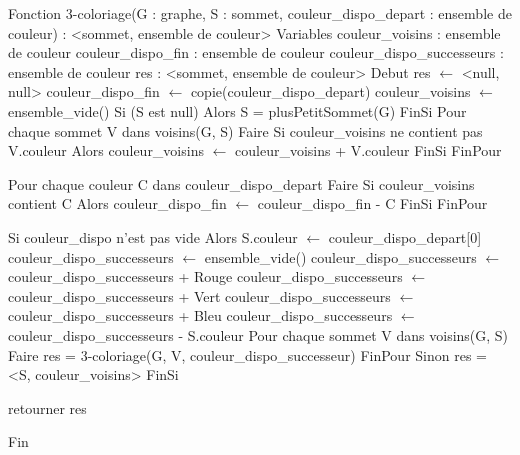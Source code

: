 \begin{algorithm}[caption={3-coloriage}] \label{alg:alg1}
    Fonction 3-coloriage(G : graphe, S : sommet,
        couleur_dispo_depart : ensemble de couleur) : <sommet, ensemble de couleur>
    Variables
        couleur_voisins : ensemble de couleur
        couleur_dispo_fin : ensemble de couleur
        couleur_dispo_successeurs : ensemble de couleur
        res : <sommet, ensemble de couleur>
    Debut
        res $\gets$ <null, null>
        couleur_dispo_fin $\gets$ copie(couleur_dispo_depart)
        couleur_voisins $\gets$ ensemble_vide()
        Si (S est null) Alors
            S = plusPetitSommet(G)
        FinSi
        Pour chaque sommet V dans voisins(G, S) Faire
            Si couleur_voisins ne contient pas V.couleur Alors
                couleur_voisins $\gets$ couleur_voisins + V.couleur
            FinSi
        FinPour

        Pour chaque couleur C dans couleur_dispo_depart Faire
            Si couleur_voisins contient C Alors
                couleur_dispo_fin $\gets$ couleur_dispo_fin - C
            FinSi
        FinPour

        Si couleur_dispo n'est pas vide Alors
            S.couleur $\gets$ couleur_dispo_depart[0]
            couleur_dispo_successeurs $\gets$ ensemble_vide()
            couleur_dispo_successeurs $\gets$ couleur_dispo_successeurs + Rouge
            couleur_dispo_successeurs $\gets$ couleur_dispo_successeurs + Vert
            couleur_dispo_successeurs $\gets$ couleur_dispo_successeurs + Bleu
            couleur_dispo_successeurs $\gets$ couleur_dispo_successeurs - S.couleur
            Pour chaque sommet V dans voisins(G, S) Faire
                res = 3-coloriage(G, V, couleur_dispo_successeur)
            FinPour
        Sinon
            res = <S, couleur_voisins>
        FinSi

        retourner res

    Fin
\end{algorithm}